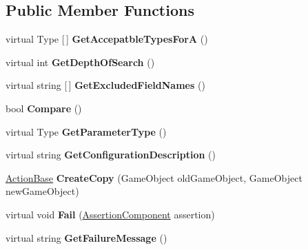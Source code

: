 \subsection*{Public Member Functions}
\begin{DoxyCompactItemize}
\item 
\mbox{\label{class_unity_test_1_1_action_base_a58141656e4c43045583a755d3c5db674}} 
virtual Type \mbox{[}$\,$\mbox{]} {\bfseries Get\+Accepatble\+Types\+ForA} ()
\item 
\mbox{\label{class_unity_test_1_1_action_base_ada9f42b8c847ebf0dd734351c709d303}} 
virtual int {\bfseries Get\+Depth\+Of\+Search} ()
\item 
\mbox{\label{class_unity_test_1_1_action_base_a06003fce540d05f2faa4fdb70d6aa2b0}} 
virtual string \mbox{[}$\,$\mbox{]} {\bfseries Get\+Excluded\+Field\+Names} ()
\item 
\mbox{\label{class_unity_test_1_1_action_base_a3cc8b5cda2dc2fe8d5c6de807da0a467}} 
bool {\bfseries Compare} ()
\item 
\mbox{\label{class_unity_test_1_1_action_base_ad3455981a387372685b94569cf79f102}} 
virtual Type {\bfseries Get\+Parameter\+Type} ()
\item 
\mbox{\label{class_unity_test_1_1_action_base_a0e3bcaef1f836b07606204533a069c26}} 
virtual string {\bfseries Get\+Configuration\+Description} ()
\item 
\mbox{\label{class_unity_test_1_1_action_base_a8864976cec5a272260b7771b9e9812fe}} 
\hyperlink{class_unity_test_1_1_action_base}{Action\+Base} {\bfseries Create\+Copy} (Game\+Object old\+Game\+Object, Game\+Object new\+Game\+Object)
\item 
\mbox{\label{class_unity_test_1_1_action_base_aae6116c8062a7aa5f430f7e6dc7a0fa0}} 
virtual void {\bfseries Fail} (\hyperlink{class_unity_test_1_1_assertion_component}{Assertion\+Component} assertion)
\item 
\mbox{\label{class_unity_test_1_1_action_base_a4157a0c26e2b9bf214fc9bfa0e01b40a}} 
virtual string {\bfseries Get\+Failure\+Message} ()
\end{DoxyCompactItemize}

